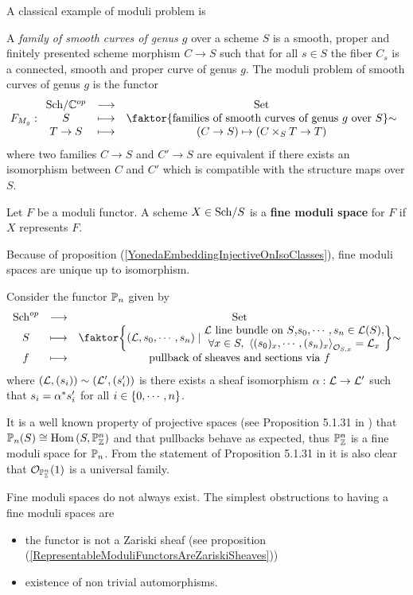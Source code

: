 A classical example of moduli problem is
\begin{example}
A \textit{family of smooth curves of genus $g$} over a scheme $S$ is a smooth, proper and finitely presented scheme morphism $C\to S$ such that for all $s\in S$ the fiber $C_s$ is a connected, smooth and proper curve of genus $g$. The moduli problem of smooth curves of genus $g$ is the functor
\[F_{M_g}:\functorDef{\Sch\C\op}{\Set}{S}{\quot{\cpa{\text{families of smooth curves of genus $g$ over $S$}}}\sim}{T\to S}{(C\to S)\mapsto (C\times_S T\to T)}\]
where two families $C\to S$ and $C'\to S$ are equivalent if there exists an isomorphism between $C$ and $C'$ which is compatible with the structure maps over $S$.
\end{example}

\begin{definition}
Let $F$ be a moduli functor. A scheme $X\in {\mathrm{Sch}}/{S}$ is a \textbf{fine moduli space} for $F$ if $X$ represents $F$.
\end{definition}

\begin{remark}
Because of proposition (\ref{YonedaEmbeddingInjectiveOnIsoClasses}), fine moduli spaces are unique up to isomorphism.
\end{remark}

\begin{example}
Consider the functor $\mathbb{P}_n$ given by
\[\functorDef{\mathrm{Sch}\op}{\Set}{S}{\quot{\cpa{(\Lc,s_0,\cdots,s_n)\mid \emat{\Lc\text{ line bundle on $S$,}s_0,\cdots,s_n\in\Lc(S),\\\forall x\in S,\ \ps{(s_0)_x,\cdots,(s_n)_x}_{\Oc_{S,x}}=\Lc_x}}}\sim}{f}{\text{pullback of sheaves and sections via $f$}}\]
where $(\mathcal{L},(s_i))\sim (\mathcal{L}',(s_i'))$ is there exists a sheaf isomorphism $\alpha:\mathcal{L}\to\mathcal{L}'$ such that $s_i=\alpha^\ast s_i'$ for all $i\in\left\{{0,\cdots, n}\right\}$.\medskip

It is a well known property of projective spaces (see Proposition 5.1.31 in \cite{QingLiu}) that $\mathbb{P}_n(S)\cong \mathrm{Hom}\,(S,\mathbb{P}^n_{\mathbb{Z}})$ and that pullbacks behave as expected, thus $\mathbb{P}^n_{\mathbb{Z}}$ is a fine moduli space for $\mathbb{P}_n$.
From the statement of Proposition 5.1.31 in \cite{QingLiu} it is also clear that $\mathcal{O}_{\mathbb{P}^n_{\mathbb{Z}}}(1)$ is a universal family.
\end{example}

Fine moduli spaces do not always exist. The simplest obstructions to having a fine moduli spaces are
\begin{itemize}
\item the functor is not a Zariski sheaf (see proposition (\ref{RepresentableModuliFunctorsAreZariskiSheaves}))
\item existence of non trivial automorphisms.
\end{itemize}

